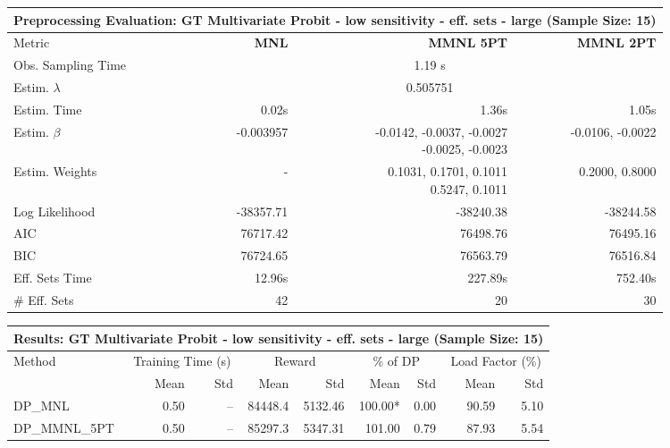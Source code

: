 
\begin{samepage}
\begin{center}
  \small
  \begin{tabular}{l|r|r|r}
    \toprule
    \multicolumn{4}{c}{\textbf{Preprocessing Evaluation: GT Multivariate Probit - low sensitivity - eff. sets - large (Sample Size: 15)}} \\
    \midrule
    Metric & \textbf{MNL} & \textbf{MMNL 5PT} & \textbf{MMNL 2PT} \\
    \midrule
    Obs. Sampling Time & \multicolumn{3}{c}{1.19 s} \\
    Estim. $\lambda$ & \multicolumn{3}{c}{0.505751} \\
    Estim. Time & 0.02s & 1.36s & 1.05s \\
    Estim. $\beta$ & -0.003957 & \makecell[tr]{-0.0142, -0.0037, -0.0027 \\ -0.0025, -0.0023} & -0.0106, -0.0022 \\
    Estim. Weights & - & \makecell[tr]{0.1031, 0.1701, 0.1011 \\ 0.5247, 0.1011} & 0.2000, 0.8000 \\
    Log Likelihood & -38357.71 & -38240.38 & -38244.58 \\
    AIC & 76717.42 & 76498.76 & 76495.16 \\
    BIC & 76724.65 & 76563.79 & 76516.84 \\
    Eff. Sets Time & 12.96s & 227.89s & 752.40s \\
    \# Eff. Sets & 42 & 20 & 30 \\
    \bottomrule
  \end{tabular}
\end{center}
\begin{center}
  \small
  \begin{tabular}{l|rr|rr|rr|rr}
    \toprule
    \multicolumn{9}{c}{\textbf{Results: GT Multivariate Probit - low sensitivity - eff. sets - large (Sample Size: 15)}} \\
    \midrule
    Method & \multicolumn{2}{c|}{Training Time (s)} & \multicolumn{2}{c|}{Reward} & \multicolumn{2}{c|}{\% of DP} & \multicolumn{2}{c}{Load Factor (\%)} \\
    & Mean & Std & Mean & Std & Mean & Std & Mean & Std \\
    \midrule
    DP\_MNL      &     0.50 &    -- &    84448.4 &    5132.46 & 100.00* &    0.00 &   90.59 &    5.10 \\
    DP\_MMNL\_5PT &     0.50 &    -- &    85297.3 &    5347.31 &  101.00 &    0.79 &   87.93 &    5.54 \\

\end{tabular}
\end{center}
\end{samepage}
